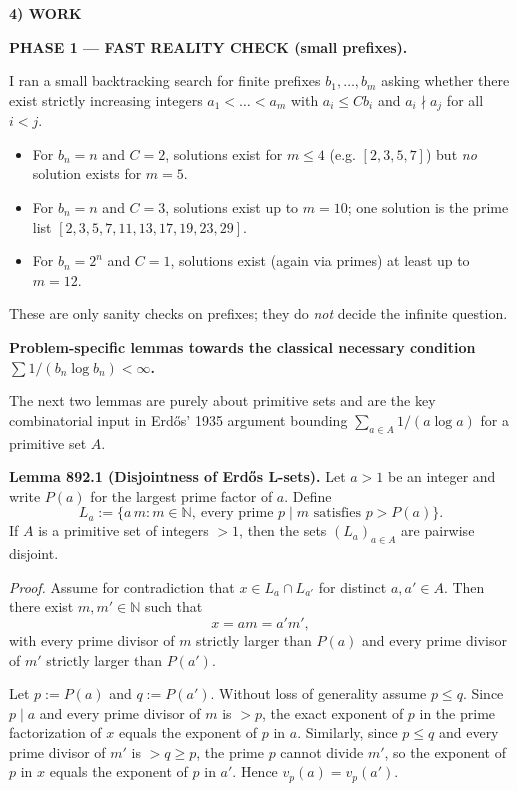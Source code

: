 \medskip
\noindent\textbf{4) WORK}

\textbf{PHASE 1 — FAST REALITY CHECK (small prefixes).}

I ran a small backtracking search for finite prefixes $b_1,\dots,b_m$ asking
whether there exist strictly increasing integers $a_1<\dots<a_m$ with
$a_i\le C b_i$ and $a_i\nmid a_j$ for all $i<j$.

\begin{itemize}
\item For $b_n=n$ and $C=2$, solutions exist for $m\le 4$ (e.g.
$[2,3,5,7]$) but \emph{no} solution exists for $m=5$.
\item For $b_n=n$ and $C=3$, solutions exist up to $m=10$;
one solution is the prime list $[2,3,5,7,11,13,17,19,23,29]$.
\item For $b_n=2^n$ and $C=1$, solutions exist (again via primes) at least up to
$m=12$.
\end{itemize}

These are only sanity checks on prefixes; they do \emph{not} decide the infinite
question.

\medskip
\textbf{Problem-specific lemmas towards the classical necessary condition
$\sum 1/(b_n\log b_n)<\infty$.}

The next two lemmas are purely about primitive sets and are the key combinatorial
input in Erd\H{o}s’ 1935 argument bounding
$\sum_{a\in A} 1/(a\log a)$ for a primitive set $A$.

\medskip
\noindent\textbf{Lemma 892.1 (Disjointness of Erd\H{o}s L-sets).}
Let $a>1$ be an integer and write $P(a)$ for the largest prime factor of $a$.
Define
\[
L_a := \{ a\,m : m\in\mathbb{N},\ \text{every prime }p\mid m \text{ satisfies } p>P(a)\}.
\]
If $A$ is a primitive set of integers $>1$, then the sets $(L_a)_{a\in A}$ are
pairwise disjoint.

\emph{Proof.}
Assume for contradiction that $x\in L_a\cap L_{a'}$ for distinct $a,a'\in A$.
Then there exist $m,m'\in\mathbb{N}$ such that
\[ x = a m = a' m', \]
with every prime divisor of $m$ strictly larger than $P(a)$ and every prime
divisor of $m'$ strictly larger than $P(a')$.

Let $p:=P(a)$ and $q:=P(a')$. Without loss of generality assume $p\le q$.
Since $p\mid a$ and every prime divisor of $m$ is $>p$, the exact exponent of $p$
in the prime factorization of $x$ equals the exponent of $p$ in $a$.
Similarly, since $p\le q$ and every prime divisor of $m'$ is $>q\ge p$, the prime
$p$ cannot divide $m'$, so the exponent of $p$ in $x$ equals the exponent of $p$
in $a'$.
Hence $v_p(a)=v_p(a')$.

